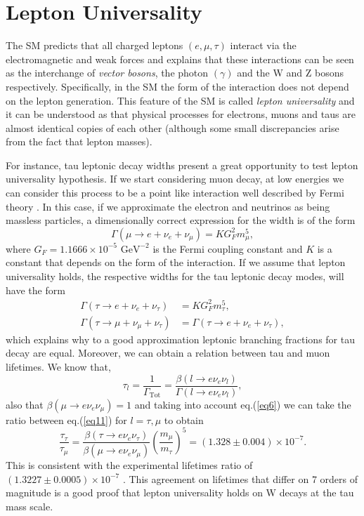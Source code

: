 \section{Lepton Universality}\label{chap2sec2}
The SM predicts that all charged leptons $(e,\mu,\tau)$ interact via the electromagnetic and weak forces and explains that these interactions can be seen as the interchange of \textit{vector bosons}, the photon $(\gamma)$ and the W and Z bosons respectively. Specifically, in the SM the form of the interaction does not depend on the lepton generation. This feature of the SM is called \textit{lepton universality} and it can be understood as that physical processes for electrons, muons and taus are almost identical copies of each other (although some small discrepancies arise from the fact that lepton masses). 

For instance, tau leptonic decay widths present a great opportunity to test lepton universality hypothesis. If we start considering muon decay, at low energies we can consider this process to be a point like interaction well described by Fermi theory \cite{FermiTheory}. In this case, if we approximate the electron and neutrinos as being massless particles, a dimensionally correct expression for the width is of the form
\begin{equation}
	\Gamma(\mu\to e+\nu_e +\nu_\mu)=KG_{F}^{2}m_{\mu}^{5},
\end{equation} 
where $G_F=1.1666\times 10^{-5} \text{ GeV}^{-2}$ is the Fermi coupling constant and $K$ is a constant that depends on the form of the interaction. If we assume that lepton universality holds, the respective widths for the tau leptonic decay modes, will have the form
\begin{align}
\Gamma(\tau\to e+\nu_e +\nu_\tau)&=KG_{F}^{2}m_{\tau}^{5},
\\
\Gamma(\tau\to \mu+\nu_\mu +\nu_\tau)&=\Gamma(\tau\to e+\nu_e +\nu_\tau),
\end{align}  
which explains why to a good approximation leptonic branching fractions for tau decay are equal. Moreover, we can obtain a relation between tau and muon lifetimes. We know that,
\begin{equation}
	\tau_l=\frac{1}{\Gamma_\text{Tot}}=\frac{\beta(l\to e\nu_e \nu_l)}{\Gamma(l\to e\nu_e \nu_l)},
	\label{eq11}
\end{equation}
also that $\beta(\mu\to e\nu_e \nu_\mu)=1$ and taking into account eq.(\ref{eq6}) we can take the ratio between eq.(\ref{eq11}) for $l=\tau ,\mu$ to obtain
\begin{equation}
\frac{\tau_\tau}{\tau_\mu}=\frac{\beta(\tau\to e\nu_e \nu_\tau)}{\beta(\mu\to e\nu_e \nu_\mu)}\left(\frac{m_\mu}{m_\tau}\right)^5=(1.328\pm 0.004)\times 10^{-7}.
\end{equation}
This is consistent with the experimental lifetimes ratio of $(1.3227\pm 0.0005)\times10^{-7}$ \cite{Martin:1992rg}. This agreement on lifetimes that differ on 7 orders of magnitude is a good proof that lepton universality holds on W decays at the tau mass scale.

